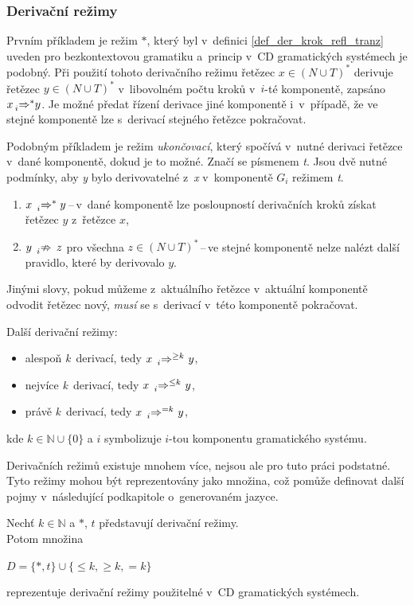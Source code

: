 \subsubsection*{Derivační režimy}

Prvním příkladem je režim $*$, který byl v~definici \ref{def_der_krok_refl_tranz} uveden pro bezkontextovou gramatiku a~princip v~CD gramatických systémech je podobný.
Při použití tohoto derivačního režimu řetězec $x \in (N \cup T)^*$ derivuje řetězec $y \in (N \cup T)^*$ v~libovolném počtu kroků v~$i$-té komponentě, zapsáno $x \prescript{}{i}{\Rightarrow}^{*}y$.
Je možné předat řízení derivace jiné komponentě i~v~případě, že ve stejné komponentě lze s~derivací stejného řetězce pokračovat.

Podobným příkladem je režim \emph{ukončovací}, který spočívá v~nutné derivaci řetězce v~dané komponentě, dokud je to možné. Značí se písmenem \emph{t}. Jsou dvě nutné podmínky, aby \emph{y} bylo derivovatelné z~\emph{x} v~komponentě $G_i$ režimem \emph{t}.
\begin{enumerate}
    \item $x\; \prescript{}{i}{\Rightarrow}^{*}\; y$\,--\,v~dané komponentě lze posloupností derivačních kroků získat řetězec $y$ z~řetězce $x$,
    \item $y\; \prescript{}{i}{\nRightarrow}\;\,z$ pro všechna $z \in (N \cup T)^{*}$\,--\,ve stejné komponentě nelze nalézt další pravidlo, které by derivovalo $y$.
\end{enumerate}
Jinými slovy, pokud můžeme z~aktuálního řetězce v~aktuální komponentě odvodit řetězec nový, \emph{musí} se s~derivací v~této komponentě pokračovat. 

Další derivační režimy:
\begin{itemize}
    \item alespoň \emph{k}~derivací, tedy $x\; \prescript{}{i}{\Rightarrow}^{\geq k}\ y$,
    \item nejvíce \emph{k}~derivací, tedy $x\; \prescript{}{i}{\Rightarrow}^{\leq k}\ y$,
    \item právě \emph{k}~derivací, tedy $x\; \prescript{}{i}{\Rightarrow}^{=k}\ y$,
\end{itemize}
kde $k \in \mathbb{N} \cup \{0\}$ a $i$ symbolizuje $i$-tou komponentu gramatického systému.

Derivačních režimů existuje mnohem více, nejsou ale pro tuto práci podstatné.
Tyto režimy mohou být reprezentovány jako množina, což pomůže definovat další pojmy v~následující podkapitole o~generovaném jazyce.
\begin{definition}\label{def_der_rezimy}
    Nechť $k\in \mathbb{N}$ a $*$, $t$ představují derivační režimy. \\
    Potom množina
    \begin{center}
        $D = \{*, t\} \cup \{\leq k, \geq k, =k\}$ 
    \end{center}        
    reprezentuje derivační režimy použitelné v~CD gramatických systémech.
\end{definition}

